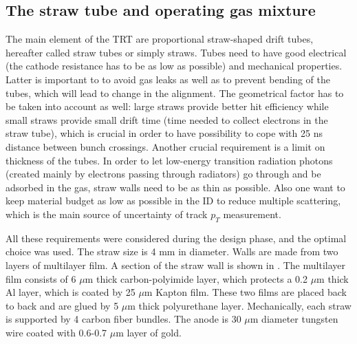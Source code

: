 
\subsection{The straw tube and operating gas mixture}

The main element of the TRT are proportional straw-shaped drift tubes, hereafter called straw tubes or simply straws.
Tubes need to have good electrical (the cathode resistance has to be as low as possible) and mechanical properties. Latter is important to to avoid gas leaks as well as to prevent bending of the tubes, which will lead to change in the alignment.
The geometrical factor has to be taken into account as well: large straws provide better hit efficiency while small straws provide small drift time (time needed to collect electrons in the straw tube), which is crucial in order to have possibility to cope with 25 ns distance between bunch crossings.
Another crucial requirement is a limit on thickness of the tubes. 
In order to let low-energy transition radiation photons (created mainly by electrons passing through radiators) go through and be adsorbed in the gas, straw walls need to be as thin as possible.
Also one want to keep material budget as low as possible in the ID to reduce multiple scattering,
which is the main source of uncertainty of track $p_T$ measurement.

All these requirements were considered during the design phase, and the optimal choice was used.
The straw size is 4 mm in diameter. Walls are made from two layers of multilayer film. A section of the straw wall is shown in .
The multilayer film consists of 6 $\mu$m thick carbon-polyimide layer, which protects a 0.2 $\mu$m thick Al layer, which is coated by 25 $\mu$m Kapton film.
These two films are placed back to back and are glued by 5 $\mu$m thick polyurethane layer.
Mechanically, each straw is supported by 4 carbon fiber bundles.
The anode is 30 $\mu$m diameter tungsten wire coated with 0.6-0.7 $\mu$m layer of gold.


